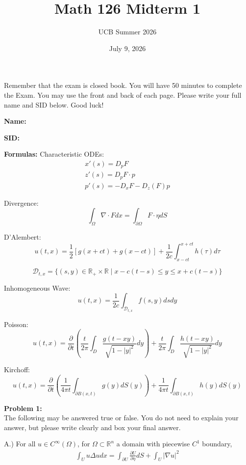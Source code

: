\documentclass{article}
\newcommand{\R}{{\mathbb{R}}}
\newcommand{\pd}{\partial}
\begin{document}
\title{Math 126 Midterm 1}
\author{UCB Summer 2026}
\date{July 9, 2026}
\maketitle

Remember that the exam is closed book. You will have 50 minutes to complete the Exam. You may use the front and back of each page. Please write your full name and SID below. Good luck!


\textbf{Name:} 

\vspace{0.5 cm}

\textbf{SID:}

\vspace{1 cm}

\textbf{Formulas:}
Characteristic ODEs: 
\begin{align*}
	x'(s) = D_p F \\
	z'(s) = D_p F \cdot p \\
	p'(s) = -D_{x} F - D_{z}(F) p
\end{align*}

Divergence: $$\int_{\Omega} \nabla \cdot F dx = \int_{\pd \Omega} F \cdot \eta dS$$

D'Alembert: $$u(t,x) = \frac{1}{2} \left[g(x+ct) + g(x-ct) \right] + \frac{1}{2c} \int_{x-ct}^{x+ct} h(\tau) d\tau $$

$$\mathcal{D}_{t,x} = \{ (s,y) \in \R_{+} \times \R \mid x-c(t-s) \leq y \leq x+c(t-s)\}$$

Inhomogeneous Wave: $$u(t,x) = \frac{1}{2c} \int_{\mathcal{D}_{t,x}} f(s,y) dsdy$$

Poisson: $$u(t,x) = \frac{\pd}{\pd t} \left( \frac{t}{2\pi} \int_{D} \frac{g(t-xy)}{\sqrt{1 - |y|^{2}}} dy\right) + \frac{t}{2\pi} \int_{D} \frac{h(t-xy)}{\sqrt{1-|y|^{2}}} dy$$

Kirchoff: $$ u(t,x) = \frac{\pd}{\pd t} \left(\frac{1}{4 \pi t} \int_{\pd B(x,t)} g(y) dS(y) \right) + \frac{1}{4\pi t} \int_{\pd B(x,t)} h(y) dS(y)$$






\newpage


\textbf{Problem 1:} \\

The following may be answered true or false. You do not need to explain your answer, but please write clearly and box your final answer. 



\vspace{1 cm}
A.) For all $u \in C^{\infty}(\Omega)$, for $\Omega \subset \R^{n}$ a domain with piecewise $C^{1}$ boundary,  
\begin{align*}
	\int_{U} u \Delta u dx = \int_{\pd U} \frac{\pd U}{\pd \eta} dS + \int_{U} |\nabla u |^{2}
\end{align*}
\end{document}
